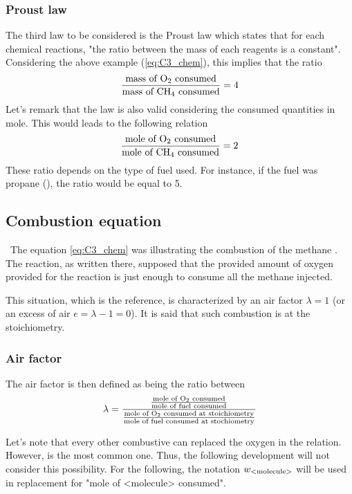 \subsubsection{Proust law}
The third law to be considered is the Proust law which states that for each chemical reactions, "the ratio between the mass of each reagents is a constant". Considering the above example (\ref{eq:C3_chem}), this implies that the ratio
\begin{equation}
\frac{\text{mass of \ce{O2} consumed}}{\text{mass of \ce{CH4} consumed}} = 4 
\end{equation}
Let's remark that the law is also valid considering the consumed quantities in mole. This would leads to the following relation
\begin{equation}
\frac{\text{mole of \ce{O2} consumed}}{\text{mole of \ce{CH4} consumed}} = 2  \label{eq:C3_molratio}
\end{equation}
These ratio depends on the type of fuel used. For instance, if the fuel was propane (), the ratio would be equal to 5.
 
\subsection{Combustion equation}
\quad\, The equation \ref{eq:C3_chem} was illustrating the combustion of the methane . The reaction, as written there, supposed that the provided amount of oxygen provided for the reaction is just enough to consume all the methane injected. 

This situation, which is the reference, is characterized by an air factor $\lambda = 1$ (or an excess of air $e=\lambda-1=0$). It is said that such combustion is at the stoichiometry.

\subsubsection{Air factor}
The air factor is then defined as being the ratio between
\begin{equation}
\lambda = \frac{\frac{\text{mole of \ce{O2} consumed}}{\text{mole of fuel consumed}}}{\frac{\text{mole of \ce{O2} consumed at stoichiometry}}{\text{mole of fuel consumed at stochiometry}}} \label{eq:C3_lbd}
\end{equation}

Let's note that every other combustive can replaced the oxygen in the relation. However,  is the most common one. Thus, the following development will not consider this possibility.
For the following, the notation $w_{\ce{\text{<molecule>}}}$ will be used in replacement for "mole of <molecule> consumed". 

